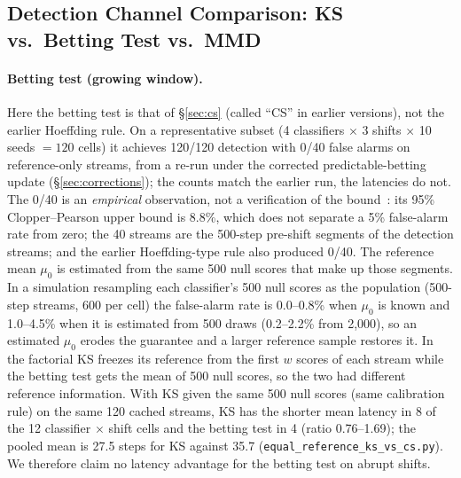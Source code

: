 \documentclass{article}
\begin{document}
\subsection{Detection Channel Comparison: KS vs.\ Betting Test vs.\ MMD}
\label{sec:channel-comparison}

\paragraph{Betting test (growing window).} Here the betting test is that of \S\ref{sec:cs} (called ``CS'' in earlier versions), not the earlier Hoeffding rule. On a representative subset (4 classifiers $\times$ 3 shifts $\times$ 10 seeds $= 120$ cells) it achieves 120/120 detection with 0/40 false alarms on reference-only streams, from a re-run under the corrected predictable-betting update (\S\ref{sec:corrections}); the counts match the earlier run, the latencies do not. The 0/40 is an \emph{empirical} observation, not a verification of the bound~\citep{waudbysmith2024estimating}: its 95\% Clopper--Pearson upper bound is 8.8\%, which does not separate a 5\% false-alarm rate from zero; the 40 streams are the 500-step pre-shift segments of the detection streams; and the earlier Hoeffding-type rule also produced 0/40. The reference mean $\mu_0$ is estimated from the same 500 null scores that make up those segments. In a simulation resampling each classifier's 500 null scores as the population (500-step streams, 600 per cell) the false-alarm rate is 0.0--0.8\% when $\mu_0$ is known and 1.0--4.5\% when it is estimated from 500 draws (0.2--2.2\% from 2{,}000), so an estimated $\mu_0$ erodes the guarantee and a larger reference sample restores it. In the factorial KS freezes its reference from the first $w$ scores of each stream while the betting test gets the mean of 500 null scores, so the two had different reference information. With KS given the same 500 null scores (same calibration rule) on the same 120 cached streams, KS has the shorter mean latency in 8 of the 12 classifier $\times$ shift cells and the betting test in 4 (ratio 0.76--1.69); the pooled mean is 27.5 steps for KS against 35.7 (\texttt{equal\_reference\_ks\_vs\_cs.py}). We therefore claim no latency advantage for the betting test on abrupt shifts.
\end{document}
